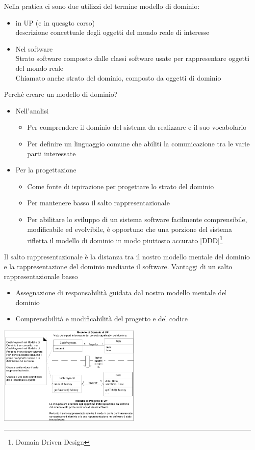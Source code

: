 \documentclass{article}
\begin{document}
Nella pratica ci sono due utilizzi del termine \vopen modello di dominio\vclose:
\begin{itemize}
    \item in UP (e in quesgto corso)\\
        descrizione concettuale degli oggetti del mondo reale di interesse
    \item Nel software\\
        Strato software composto dalle classi software usate per rappresentare oggetti del mondo reale\\
        Chiamato anche strato del dominio, composto da oggetti di dominio
\end{itemize}
Perché creare un modello di dominio?
\begin{itemize}
    \item Nell'analisi
        \begin{itemize}
            \item Per comprendere il dominio del sistema da realizzare e il suo vocabolario
            \item Per definire un linguaggio comune che abiliti la comunicazione tra le varie parti interessate
        \end{itemize}
    \item Per la progettazione\begin{itemize}
        \item Come fonte di ispirazione per progettare lo strato del dominio
        \item Per mantenere basso il salto rappresentazionale
        \item Per abilitare lo sviluppo di un sistema software facilmente comprensibile, modificabile ed evolvibile, è opportuno che una porzione del sistema rifletta il modello di dominio in modo piuttosto accurato [DDD]\footnote{Domain Driven Design}
    \end{itemize}
\end{itemize}
Il salto rappresentazionale è la distanza tra il nostro modello mentale del dominio e la rappresentazione del dominio mediante il software. Vantaggi di un salto rappresentazionale basso
\begin{itemize} 
    \item Assegnazione di responsabilità guidata dal nostro modello mentale del dominio
    \item Comprensibilità e modificabilità del progetto e del codice
\end{itemize}
\begin{center}
    \includegraphics[width=7cm]{images/salto rappresentazionale basso.png}
\end{center}
\end{document}
